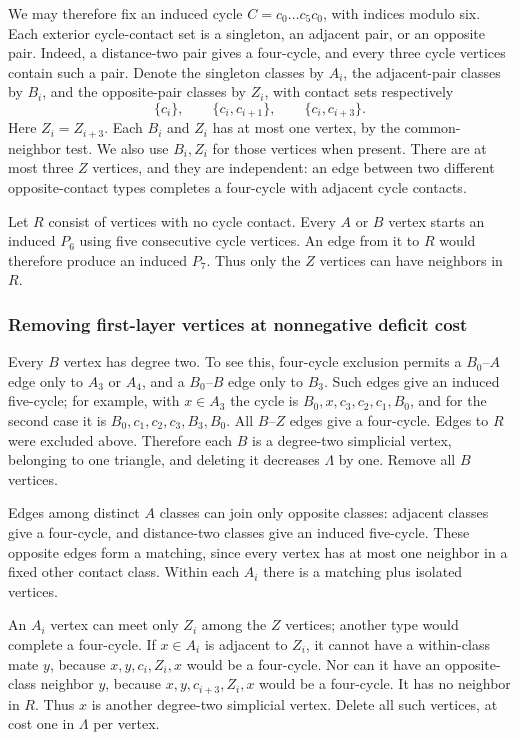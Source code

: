 \documentclass[11pt,a4paper]{article}
\theoremstyle{definition}\newtheorem{definition}[theorem]{Definition}
\theoremstyle{remark}\newtheorem{remark}[theorem]{Remark}
\begin{document}
We may therefore fix an induced cycle $C=c_0\dots c_5c_0$, with indices
modulo six. Each exterior cycle-contact set is a singleton, an adjacent
pair, or an opposite pair. Indeed, a distance-two pair gives a four-cycle,
and every three cycle vertices contain such a pair. Denote the singleton
classes by $A_i$, the adjacent-pair classes by $B_i$, and the opposite-pair
classes by $Z_i$, with contact sets respectively
\[
 \{c_i\},\qquad \{c_i,c_{i+1}\},\qquad \{c_i,c_{i+3}\}.
\]
Here $Z_i=Z_{i+3}$. Each $B_i$ and $Z_i$ has at most one vertex, by the
common-neighbor test. We also use $B_i,Z_i$ for those vertices when
present. There are at most three $Z$ vertices, and they are independent:
an edge between two different opposite-contact types completes a
four-cycle with adjacent cycle contacts.

Let $R$ consist of vertices with no cycle contact. Every $A$ or $B$
vertex starts an induced $P_6$ using five consecutive cycle vertices.
An edge from it to $R$ would therefore produce an induced $P_7$. Thus
only the $Z$ vertices can have neighbors in $R$.

\subsubsection{Removing first-layer vertices at nonnegative deficit cost}
Every $B$ vertex has degree two. To see this, four-cycle exclusion
permits a $B_0$--$A$ edge only to $A_3$ or $A_4$, and a $B_0$--$B$ edge
only to $B_3$. Such edges give an induced five-cycle; for example, with
$x\in A_3$ the cycle is $B_0,x,c_3,c_2,c_1,B_0$, and for the second
case it is $B_0,c_1,c_2,c_3,B_3,B_0$. All $B$--$Z$ edges give a
four-cycle. Edges to $R$ were excluded above. Therefore each $B$ is a
degree-two simplicial vertex, belonging to one triangle, and deleting it
decreases $\Lambda$ by one. Remove all $B$ vertices.

Edges among distinct $A$ classes can join only opposite classes:
adjacent classes give a four-cycle, and distance-two classes give an
induced five-cycle. These opposite edges form a matching, since every
vertex has at most one neighbor in a fixed other contact class.
Within each $A_i$ there is a matching plus isolated vertices.

An $A_i$ vertex can meet only $Z_i$ among the $Z$ vertices; another type
would complete a four-cycle. If $x\in A_i$ is adjacent to $Z_i$, it
cannot have a within-class mate $y$, because $x,y,c_i,Z_i,x$ would be a
four-cycle. Nor can it have an opposite-class neighbor $y$, because
$x,y,c_{i+3},Z_i,x$ would be a four-cycle. It has no neighbor in $R$.
Thus $x$ is another degree-two simplicial vertex. Delete all such
vertices, at cost one in $\Lambda$ per vertex.
\end{document}
